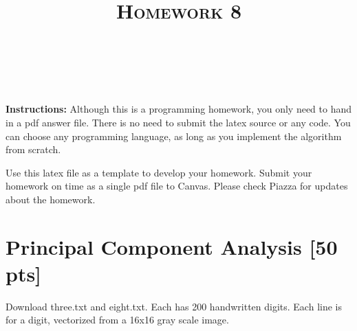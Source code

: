 \documentclass[a4paper]{article}
\title{\textsc{Homework 8}} %
\author{
\red{$>>$NAME HERE$<<$} \\
\red{$>>$ID HERE$<<$}\\
}
\date{}
\theoremstyle{definition}
\begin{document}
\maketitle 


\textbf{Instructions:} 
Although this is a programming homework, you only need to hand in a pdf answer file.
There is no need to submit the latex source or any code.
You can choose any programming language, as long as you implement the algorithm from scratch.

Use this latex file as a template to develop your homework.
Submit your homework on time as a single pdf file to Canvas.
Please check Piazza for updates about the homework.


\section{Principal Component Analysis [50 pts]}
Download three.txt and eight.txt.  Each has 200 handwritten digits.  Each line is for a digit, vectorized from a 16x16 gray scale image.  
\end{document}
